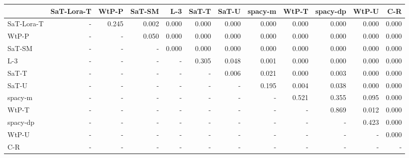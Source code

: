 \begin{tabular}{lrrrrrrrrrrr}
\toprule
 & SaT-Lora-T & WtP-P & SaT-SM & L-3 & SaT-T & SaT-U & spacy-m & WtP-T & spacy-dp & WtP-U & C-R \\
\midrule
SaT-Lora-T & - & 0.245 & 0.002 & 0.000 & 0.000 & 0.000 & 0.000 & 0.000 & 0.000 & 0.000 & 0.000 \\
WtP-P & - & - & 0.050 & 0.000 & 0.000 & 0.000 & 0.000 & 0.000 & 0.000 & 0.000 & 0.000 \\
SaT-SM & - & - & - & 0.000 & 0.000 & 0.000 & 0.000 & 0.000 & 0.000 & 0.000 & 0.000 \\
L-3 & - & - & - & - & 0.305 & 0.048 & 0.001 & 0.000 & 0.000 & 0.000 & 0.000 \\
SaT-T & - & - & - & - & - & 0.006 & 0.021 & 0.000 & 0.003 & 0.000 & 0.000 \\
SaT-U & - & - & - & - & - & - & 0.195 & 0.004 & 0.038 & 0.000 & 0.000 \\
spacy-m & - & - & - & - & - & - & - & 0.521 & 0.355 & 0.095 & 0.000 \\
WtP-T & - & - & - & - & - & - & - & - & 0.869 & 0.012 & 0.000 \\
spacy-dp & - & - & - & - & - & - & - & - & - & 0.423 & 0.000 \\
WtP-U & - & - & - & - & - & - & - & - & - & - & 0.000 \\
C-R & - & - & - & - & - & - & - & - & - & - & - \\
\bottomrule
\end{tabular}

